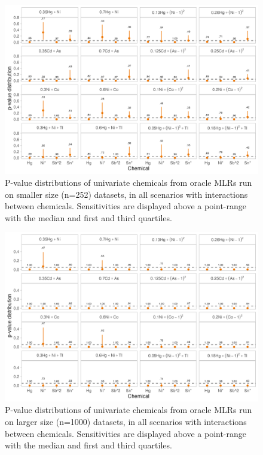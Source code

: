 \documentclass[12pt, twoside]{amherstthesis}
\begin{document}
\begin{figure}

{\centering \includegraphics[width=0.8\linewidth]{figures/ch4_osm_univ_pval} 

}

\caption{P-value distributions of univariate chemicals from oracle MLRs run on smaller size (n=252) datasets, in all scenarios with interactions between chemicals. Sensitivities are displayed above a point-range with the median and first and third quartiles.}\label{fig:osmunivp}
\end{figure}
\begin{figure}

{\centering \includegraphics[width=0.8\linewidth]{figures/ch4_olg_univ_pval} 

}

\caption{P-value distributions of univariate chemicals from oracle MLRs run on larger size (n=1000) datasets, in all scenarios with interactions between chemicals. Sensitivities are displayed above a point-range with the median and first and third quartiles.}\label{fig:olgunivp}
\end{figure}
\end{document}
